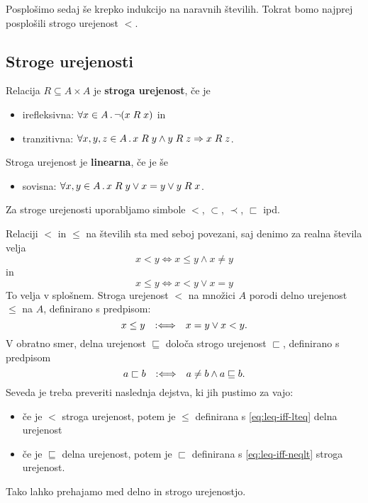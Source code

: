 Posplošimo sedaj še krepko indukcijo na naravnih številih. Tokrat bomo najprej posplošili
strogo urejenost $<$.

\subsection{Stroge urejenosti}

\begin{definicija}
  Relacija $R \subseteq A \times A$ je \textbf{stroga urejenost}, če je
  \begin{itemize}
  \item irefleksivna: $\forall x \in A \,.\, \lnot (x \mathrel{R} x)$ in
  \item tranzitivna: $\forall x, y, z \in A \,.\, x \mathrel{R} y \land y \mathrel{R} z \Rightarrow x \mathrel{R} z$.
  \end{itemize}
  Stroga urejenost je \textbf{linearna}, če je še
  \begin{itemize}
  \item sovisna: $\forall x, y \in A \,.\, x \mathrel{R} y \lor x = y \lor y \mathrel{R} x$.
  \end{itemize}
  Za stroge urejenosti uporabljamo simbole $<$, $\subset$, $\prec$, $\sqsubset$ ipd.
\end{definicija}

Relaciji $<$ in $\leq$ na številih sta med seboj povezani, saj denimo za realna števila velja
%
\begin{equation*}
  x < y \iff x \leq y \land x \neq y
\end{equation*}
%
in
%
\begin{equation*}
  x \leq y \iff x < y \lor x = y
\end{equation*}
%
To velja v splošnem. Stroga urejenost $<$ na množici $A$ porodi delno urejenost $\leq$ na $A$,
definirano s predpisom:
%
\begin{equation}
  \label{eq:leq-iff-lteq}
  x \leq y  \quad {{:}{\Longleftrightarrow}}\quad x = y \lor x < y.
\end{equation}
%
V obratno smer, delna urejenost $\sqsubseteq$ določa strogo urejenost $\sqsubset$, definirano s predpisom
%
\begin{equation}
  \label{eq:leq-iff-neqlt}
  a \sqsubset b  \quad {{:}{\Longleftrightarrow}}\quad  a \neq b \land a \sqsubseteq b.
\end{equation}
%
Seveda je treba preveriti naslednja dejstva, ki jih pustimo za vajo:
%
\begin{itemize}
\item če je $<$ stroga urejenost, potem je $\leq$ definirana s \eqref{eq:leq-iff-lteq} delna urejenost
\item če je $\sqsubseteq$ delna urejenost, potem je $\sqsubset$ definirana s \eqref{eq:leq-iff-neqlt} stroga urejenost.
\end{itemize}
%
Tako lahko prehajamo med delno in strogo urejenostjo.

